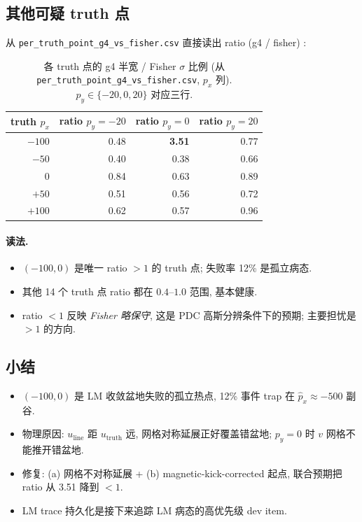 
\subsection{其他可疑 truth 点}
\label{sec:partIII:basin:other_points}

从 \texttt{per\_truth\_point\_g4\_vs\_fisher.csv} 直接读出 ratio (g4 / fisher) :

\begin{table}[H]
\centering\small
\caption{各 truth 点的 g4 半宽 / Fisher $\sigma$ 比例 (从 \texttt{per\_truth\_point\_g4\_vs\_fisher.csv}, $p_x$ 列). $p_y \in \{-20, 0, 20\}$ 对应三行.}
\label{tab:partIII:other_truth_points}
\begin{tabular}{rrrr}
\toprule
truth $p_x$ & ratio $p_y = -20$ & ratio $p_y = 0$ & ratio $p_y = 20$ \\
\midrule
$-100$ & 0.48 & \textbf{3.51} & 0.77 \\
$-50$  & 0.40 & 0.38 & 0.66 \\
$0$    & 0.84 & 0.63 & 0.89 \\
$+50$  & 0.51 & 0.56 & 0.72 \\
$+100$ & 0.62 & 0.57 & 0.96 \\
\bottomrule
\end{tabular}
\end{table}

\paragraph{读法.}
\begin{itemize}[nosep]
  \item $(-100, 0)$ 是唯一 ratio $> 1$ 的 truth 点; 失败率 12\% 是孤立病态.
  \item 其他 14 个 truth 点 ratio 都在 $0.4$--$1.0$ 范围, 基本健康.
  \item ratio $< 1$ 反映 \emph{Fisher 略保守}, 这是 PDC 高斯分辨条件下的预期; 主要担忧是 $> 1$ 的方向.
\end{itemize}

\subsection{小结}
\label{sec:partIII:basin:summary}

\begin{itemize}[nosep]
  \item $(-100, 0)$ 是 LM 收敛盆地失败的孤立热点, 12\% 事件 trap 在 $\hat p_x \approx -500$ 副谷.
  \item 物理原因: $u_{\mathrm{line}}$ 距 $u_{\mathrm{truth}}$ 远, 网格对称延展正好覆盖错盆地; $p_y = 0$ 时 $v$ 网格不能推开错盆地.
  \item 修复: (a) 网格不对称延展 + (b) magnetic-kick-corrected 起点, 联合预期把 ratio 从 3.51 降到 $< 1$.
  \item LM trace 持久化是接下来追踪 LM 病态的高优先级 dev item.
\end{itemize}

